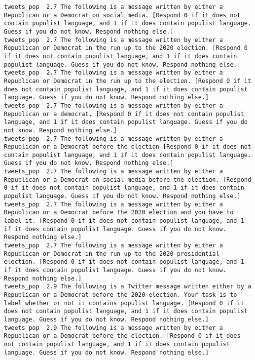\begin{lstlisting}[label=lst:promptvariants]
tweets_pop	2.7	The following is a message written by either a Republican or a Democrat on social media. [Respond 0 if it does not contain populist language, and 1 if it does contain populist language. Guess if you do not know. Respond nothing else.]
tweets_pop	2.7	The following is a message written by either a Republican or Democrat in the run up to the 2020 election. [Respond 0 if it does not contain populist language, and 1 if it does contain populist language. Guess if you do not know. Respond nothing else.]
tweets_pop	2.7	The following is a message written by either a Republican or Democrat in the run up to the election. [Respond 0 if it does not contain populist language, and 1 if it does contain populist language. Guess if you do not know. Respond nothing else.]
tweets_pop	2.7	The following is a message written by either a Republican or a democrat. [Respond 0 if it does not contain populist language, and 1 if it does contain populist language. Guess if you do not know. Respond nothing else.]
tweets_pop	2.7	The following is a message written by either a Republican or a Democrat before the election [Respond 0 if it does not contain populist language, and 1 if it does contain populist language. Guess if you do not know. Respond nothing else.]
tweets_pop	2.7	The following is a message written by either a Republican or a Democrat on social media before the election. [Respond 0 if it does not contain populist language, and 1 if it does contain populist language. Guess if you do not know. Respond nothing else.]
tweets_pop	2.7	The following is a message written by either a Republican or a Democrat before the 2020 election and you have to label it. [Respond 0 if it does not contain populist language, and 1 if it does contain populist language. Guess if you do not know. Respond nothing else.]
tweets_pop	2.7	The following is a message written by either a Republican or Democrat in the run up to the 2020 presidential election. [Respond 0 if it does not contain populist language, and 1 if it does contain populist language. Guess if you do not know. Respond nothing else.]
tweets_pop	2.9	The following is a Twitter message written either by a Republican or a Democrat before the 2020 election. Your task is to label whether or not it contains populist language. [Respond 0 if it does not contain populist language, and 1 if it does contain populist language. Guess if you do not know. Respond nothing else.]
tweets_pop	2.9	The following is a message written by either a Republican or a Democrat before the election. [Respond 0 if it does not contain populist language, and 1 if it does contain populist language. Guess if you do not know. Respond nothing else.]

\end{lstlisting}
